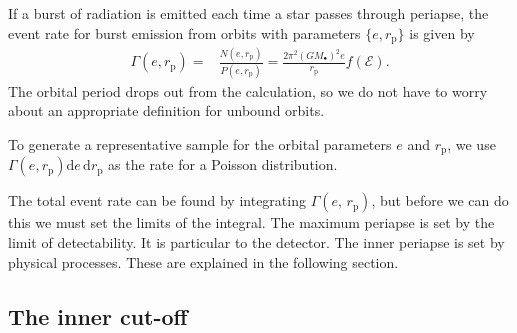 \documentclass[useAMS,usedcolumn,usegraphicx,usenatbib]{mn2e}
\newcommand{\sub}[1]{\ensuremath{_\mathrm{#1}}}
\newcommand{\dd}{\ensuremath{\mathrm{d}}}
\begin{document}
If a burst of radiation is emitted each time a star passes through periapse, the event rate for burst emission from orbits with parameters $\{e, r\sub{p}\}$ is given by
\begin{align}
\Gamma(e, r\sub{p}) = {} & \frac{N(e, r\sub{p})}{P(e, r\sub{p})} = \frac{2\pi^2(GM_\bullet)^2 e}{r\sub{p}}f(\mathcal{E}).
\label{eq:Gamma}
\end{align}
The orbital period drops out from the calculation, so we do not have to worry about an appropriate definition for unbound orbits.



To generate a representative sample for the orbital parameters $e$ and $r\sub{p}$, we use $\Gamma(e, r\sub{p})\dd e\, \dd r\sub{p}$ as the rate for a Poisson distribution.

The total event rate can be found by integrating $\Gamma(e,\,r\sub{p})$, but before we can do this we must set the limits of the integral. The maximum periapse is set by the limit of detectability. It is particular to the detector. The inner periapse is set by physical processes. These are explained in the following section.

\subsection{The inner cut-off}\label{sec:inner-cut}
\end{document}
